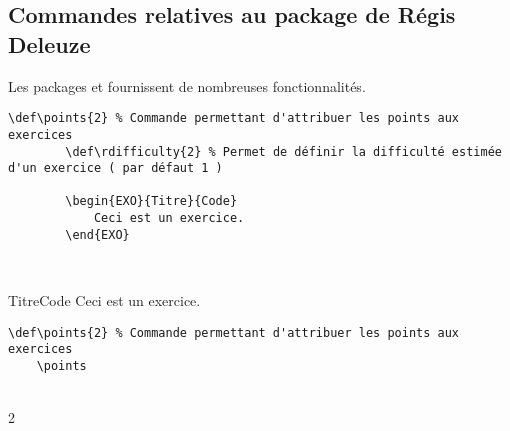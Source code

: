 \subsection{Commandes relatives au package de Régis Deleuze}

Les packages  et  fournissent de nombreuses fonctionnalités. 
\begin{tcolorbox}[colback=yellow!10!white, title=Exemple d'utilisation pour \texttt{rdexo}]
    \begin{minipage}{0.45\textwidth}
    \begin{lstlisting}[breaklines]
        \def\points{2} % Commande permettant d'attribuer les points aux exercices
        \def\rdifficulty{2} % Permet de définir la difficulté estimée d'un exercice ( par défaut 1 )

        \begin{EXO}{Titre}{Code}
            Ceci est un exercice.
        \end{EXO}
    \end{lstlisting}
    \end{minipage}
    \hfill
    \begin{minipage}{0.45\textwidth}
    \phantom{a}\\
    \def\points{2} %
        \def\rdifficulty{2} %

        \begin{EXO}{Titre}{Code}
            Ceci est un exercice.
        \end{EXO}
    \end{minipage}
    \end{tcolorbox}

\begin{tcolorbox}[colback=yellow!10!white, title=Exemple d'utilisation pour \texttt{points}]
\begin{minipage}{0.45\textwidth}
\begin{lstlisting}[breaklines]
    \def\points{2} % Commande permettant d'attribuer les points aux exercices
    \points
\end{lstlisting}
\end{minipage}
\hfill
\begin{minipage}{0.45\textwidth}
\phantom{a}\\
\def\points{2} %
    \points
\end{minipage}
\end{tcolorbox}




